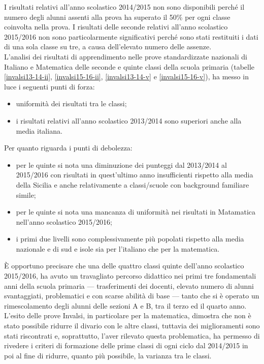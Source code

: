 \documentclass[12pt,a4paper,oneside]{memoir}
\begin{document}
I risultati relativi all'anno scolastico 2014/2015 non sono disponibili perché il numero degli alunni assenti alla prova ha superato il 50\% per ogni classe coinvolta nella prova. I risultati delle seconde relativi all'anno scolastico 2015/2016 non sono particolarmente significativi perché sono stati restituiti i dati di una sola classe su tre, a causa dell'elevato numero delle assenze.\\
L'analisi dei risultati di apprendimento nelle prove standardizzate nazionali di Italiano e Matematica delle seconde e quinte classi della scuola primaria (tabelle \ref{invalsi13-14-ii}, \ref{invalsi15-16-ii}, \ref{invalsi13-14-v} e \ref{invalsi15-16-v}), ha messo in luce i seguenti punti di forza:
\begin{itemize}
\item uniformità dei risultati tra le classi;
\item i risultati relativi all'anno scolastico 2013/2014 sono superiori anche alla media italiana.
\end{itemize}
Per quanto riguarda i punti di debolezza:
\begin{itemize}
\item per le quinte si nota una diminuzione dei punteggi dal 2013/2014 al 2015/2016 con risultati in quest'ultimo anno insufficienti rispetto alla media della Sicilia e anche relativamente a classi/scuole con background familiare simile;
\item per le quinte si nota una mancanza di uniformità nei risultati in Matamatica nell'anno scolastico 2015/2016;
\item i primi due livelli sono complessivamente più popolati rispetto alla media nazionale e di sud e isole sia per l'italiano  che per la matematica.
\end{itemize}

\`{E} opportuno precisare che una delle quattro classi quinte dell'anno scolastico 2015/2016, ha avuto un travagliato percorso didattico nei primi tre fondamentali anni della scuola primaria --- trasferimenti dei docenti, elevato numero di alunni svantaggiati, problematici e con scarse abilità di base --- tanto che si è operato un rimescolamento degli alunni delle sezioni A e B, tra il terzo ed il quarto anno. L'esito delle prove Invalsi, in particolare per la matematica, dimostra che non è stato possibile ridurre il divario con le altre classi, tuttavia dei miglioramenti sono stati riscontrati e, soprattutto, l'aver rilevato questa problematica, ha permesso di rivedere i criteri di formazione delle prime classi di ogni ciclo dal 2014/2015 in poi al fine di ridurre, quanto più possibile, la varianza tra le classi.  
\end{document}
